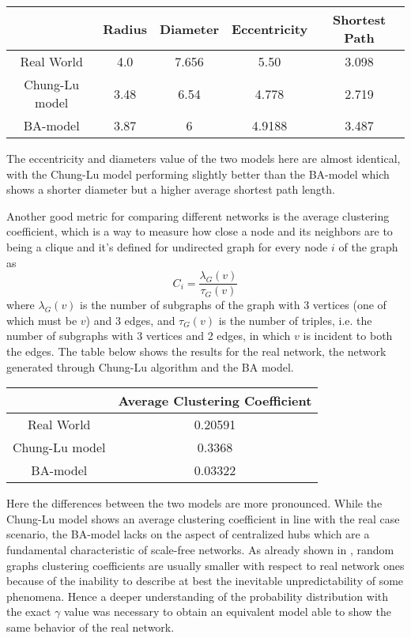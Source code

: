 	\begin{center}
		\begin{tabulary}{\linewidth}{| C | C | C | C | C |}
			\hline
			& Radius & Diameter & Eccentricity & Shortest Path \\ \hline
			Real World & 4.0 & 7.656 & 5.50 & 3.098 \\ \hline
			Chung-Lu model & 3.48 & 6.54 &  4.778 &  2.719 \\ \hline
			BA-model & 3.87 & 6 & 4.9188 & 3.487 \\ 
			\hline
		\end{tabulary}
	\end{center}
	The eccentricity and diameters value of the two models here are almost identical, with the Chung-Lu model performing slightly better than the BA-model which shows a shorter diameter but a higher average shortest path length.
	
	Another good metric for comparing different networks is the average clustering coefficient, which is a way to measure how close a node and its neighbors are to being a clique and it's defined for undirected graph for every node $i$ of the graph as $$C_i = \frac{\lambda_G(v)}{\tau_G(v)}$$ where $\lambda_G(v)$ is the number of subgraphs of the graph with 3 vertices (one of which must be $v$) and 3 edges, and $\tau_G(v)$ is the number of triples, i.e. the number of subgraphs with 3 vertices and 2 edges, in which $v$ is incident to both the edges. The table below shows the results for the real network, the network generated through Chung-Lu algorithm and the BA model.
	\begin{center}
		\begin{tabulary}{0.75\linewidth}{| C | C |}
			\hline
			& Average Clustering Coefficient \\ \hline
			Real World & 0.20591 \\ \hline
			Chung-Lu model & 0.3368 \\ \hline
			BA-model & 0.03322 \\
			\hline
		\end{tabulary}
	\end{center} 
	Here the differences between the two models are more pronounced. While the Chung-Lu model shows an average clustering coefficient in line with the real case scenario, the BA-model lacks on the aspect of centralized hubs which are a fundamental characteristic of scale-free networks. As already shown in \cite{Watts1998}, random graphs clustering coefficients are usually smaller with respect to real network ones because of the inability to describe at best the inevitable unpredictability of some phenomena. Hence a deeper understanding of the probability distribution with the exact $\gamma$ value was necessary to obtain an equivalent model able to show the same behavior of the real network.
	
